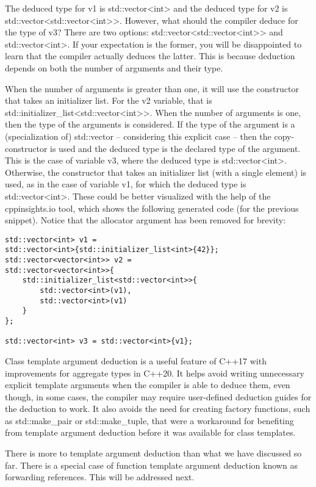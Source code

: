 The deduced type for v1 is std::vector<int> and the deduced type for v2 is std::vector<std::vector<int>>. However, what should the compiler deduce for the type of v3? There are two options: std::vector<std::vector<int>> and std::vector<int>. If your expectation is the former, you will be disappointed to learn that the compiler actually deduces the latter. This is because deduction depends on both the number of arguments and their type.

When the number of arguments is greater than one, it will use the constructor that takes an initializer list. For the v2 variable, that is std::initializer\_list<std::vector<int>>. When the number of arguments is one, then the type of the arguments is considered. If the type of the argument is a (specialization of) std::vector – considering this explicit case – then the copy-constructor is used and the deduced type is the declared type of the argument. This is the case of variable v3, where the deduced type is std::vector<int>. Otherwise, the constructor that takes an initializer list (with a single element) is used, as in the case of variable v1, for which the deduced type is std::vector<int>. These could be better visualized with the help of the cppinsights.io tool, which shows the following generated code (for the previous snippet). Notice that the allocator argument has been removed for brevity:

\begin{lstlisting}[style=styleCXX]
std::vector<int> v1 =
std::vector<int>{std::initializer_list<int>{42}};
std::vector<vector<int>> v2 =
std::vector<vector<int>>{
	std::initializer_list<std::vector<int>>{
		std::vector<int>(v1),
		std::vector<int>(v1)
	}
};

std::vector<int> v3 = std::vector<int>{v1};
\end{lstlisting}

Class template argument deduction is a useful feature of C++17 with improvements for aggregate types in C++20. It helps avoid writing unnecessary explicit template arguments when the compiler is able to deduce them, even though, in some cases, the compiler may require user-defined deduction guides for the deduction to work. It also avoids the need for creating factory functions, such as std::make\_pair or std::make\_tuple, that were a workaround for benefiting from template argument deduction before it was available for class templates.

There is more to template argument deduction than what we have discussed so far. There is a special case of function template argument deduction known as forwarding references. This will be addressed next.







